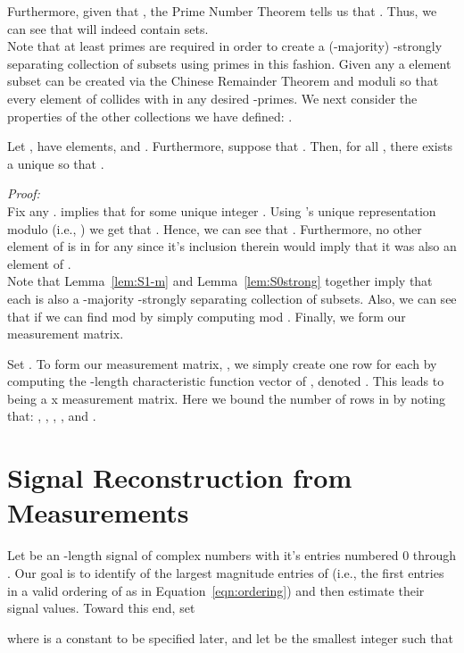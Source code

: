 \documentclass{article}
\begin{document}
Furthermore, given that , the Prime Number Theorem tells us that .  Thus, we can see that  will indeed contain  sets.~~ \\

Note that at least  primes are required in order to create a (-majority) -strongly separating collection of subsets using primes in this fashion.  Given any  a  element subset  can be created via the Chinese Remainder Theorem and  moduli so that every element of  collides with  in any desired  -primes.  We next consider the properties of the other  collections we have defined:  .

\begin{Lemma}
Let ,  have  elements, and .  Furthermore, suppose that . Then, for all , there exists a unique  so that .
\label{lem:S1-m}
\end{Lemma}

\noindent \textit{Proof:}\\

Fix any .   implies that  for some unique integer .  Using 's unique representation modulo  (i.e., ) we get that .  Hence, we can see that .  Furthermore, no other element of  is in  for any  since it's inclusion therein would imply that it was also an element of .~~ \\

Note that Lemma~\ref{lem:S1-m} and Lemma~\ref{lem:S0strong} together imply that each  is also a -majority -strongly separating collection of subsets.  Also, we can see that if  we can find  mod  by simply computing  mod .  Finally, we form our measurement matrix.

Set .  To form our measurement matrix, , we simply create one row for each  by computing the -length characteristic function vector of , denoted .  This leads to  being a  x  measurement matrix.  Here we bound the number of rows in  by noting that:  ,  ,  ,  , and  .

\section{Signal Reconstruction from Measurements}
\label{sec:SigReconstruct}

Let  be an -length signal of complex numbers with it's  entries numbered 0 through .  Our goal is to identify  of the largest magnitude entries of  (i.e., the first  entries in a valid ordering of  as in Equation~\ref{eqn:ordering}) and then estimate their signal values.  Toward this end, set 

where  is a constant to be specified later, and let  be the smallest integer such that 
\end{document}
